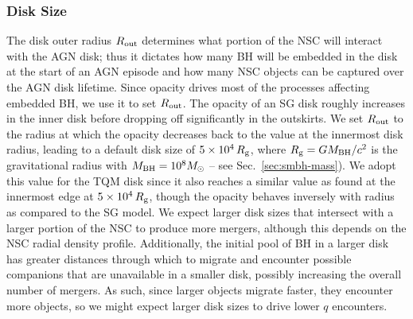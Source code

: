 \subsubsection{Disk Size}
The disk outer radius $R_{\rm out}$ determines what portion of the NSC will interact with the AGN disk; thus it dictates how many BH will be embedded in the disk at the start of an AGN episode and how many NSC objects can be captured over the AGN disk lifetime.
Since opacity drives most of the processes affecting embedded BH, we use it to set $R_{\rm out}$.
The opacity of an SG disk roughly increases in the inner disk before dropping off significantly in the outskirts.
We set $R_{\rm out}$ to the radius at which the opacity decreases back to the value at the innermost disk radius, leading to a default disk size of $5\times10^4\,R_{\rm g}$, where $R_{\rm g} = GM_{\rm BH}/c^2$ is the gravitational radius with $M_{\rm BH}=10^{8}M_{\odot}$ -- see Sec.~\ref{sec:smbh-mass}).
We adopt this value for the TQM disk since it also reaches a similar value as found at the innermost edge at $5\times10^4\,R_{\rm g}$, though the opacity behaves inversely with radius as compared to the SG model.
We expect larger disk sizes that intersect with a larger portion of the NSC to produce more mergers, although this depends on the NSC radial density profile.
Additionally, the initial pool of BH in a larger disk has greater distances through which to migrate and encounter possible companions that are unavailable in a smaller disk, possibly increasing the overall number of mergers.
As such, since larger objects migrate faster, they encounter more objects, so we might expect larger disk sizes to drive lower $q$ encounters.

